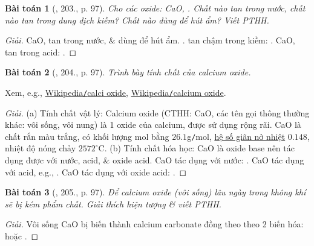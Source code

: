 \documentclass{article}
\newtheorem{baitoan}{Bài toán}
\begin{document}
\begin{baitoan}[\cite{Nguyen_Buu_Can_500_BT_Hoa_Hoc_THCS}, 203., p. 97]
	Cho các oxide: {\rm CaO, }. Chất nào tan trong nước, chất nào tan trong dung dịch kiềm? Chất nào dùng để hút ẩm? Viết {\rm PTHH}.
\end{baitoan}

\begin{proof}[Giải]
	CaO,  tan trong nước, \& dùng để hút ẩm. .  tan chậm trong kiềm: . CaO,  tan trong acid: .
\end{proof}

\begin{baitoan}[\cite{Nguyen_Buu_Can_500_BT_Hoa_Hoc_THCS}, 204., p. 97]
	Trình bày tính chất của calcium oxide.
\end{baitoan}
Xem, e.g., \href{https://vi.wikipedia.org/wiki/Calci_oxide}{Wikipedia{\tt/}calci oxide}, \href{https://en.wikipedia.org/wiki/Calcium_oxide}{Wikipedia{\tt/}calcium oxide}.

\begin{proof}[Giải]
	(a) Tính chất vật lý: Calcium oxide (CTHH: CaO, các tên gọi thông thường khác: vôi sống, vôi nung) là 1 oxide của calcium, được sử dụng rộng rãi. CaO là chất rắn màu trắng, có khối lượng mol bằng $26.1$g{\tt/}mol, \href{https://vi.wikipedia.org/wiki/H%E1%BB%87_s%E1%BB%91_gi%C3%A3n_n%E1%BB%9F_nhi%E1%BB%87t}{hệ số giãn nở nhiệt} $0.148$, nhiệt độ nóng chảy $2572^\circ$C. (b) Tính chất hóa học: CaO là oxide base nên tác dụng được với nước, acid, \& oxide acid. CaO tác dụng với nước: \ce{CaO + H2O -> Ca(OH)2}. CaO tác dụng với acid, e.g., \ce{CaO + $2$HCl -> CaCl2 + H2O}. CaO tác dụng với oxide acid: \ce{CaO + CO2 -> CaCO3}.
\end{proof}

\begin{baitoan}[\cite{Nguyen_Buu_Can_500_BT_Hoa_Hoc_THCS}, 205., p. 97]
	Để calcium oxide (vôi sống) lâu ngày trong không khí sẽ bị kém phẩm chất. Giải thích hiện tượng \& viết {\rm PTHH}.
\end{baitoan}

\begin{proof}[Giải]
	Vôi sống CaO bị biến thành calcium carbonate  đồng theo theo 2 biến hóa:  hoặc .
\end{proof}
\end{document}
